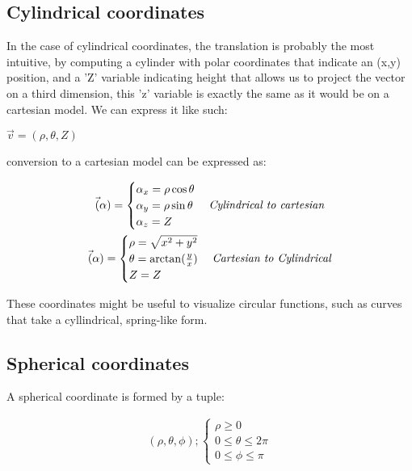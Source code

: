 \documentclass[11pt,fleqn]{book} %
\begin{document}
\subsection{Cylindrical coordinates}
In the case of cylindrical coordinates, the translation is probably the most intuitive, by computing
a cylinder with polar coordinates that indicate an (x,y) position, and a 'Z' variable indicating height 
that allows us to project the vector on a third dimension, this 'z' variable is exactly the same as it would be
on a cartesian model. We can express it like such:

$ \vec{v} = ( \rho, \theta, Z) $

conversion to a cartesian model can be expressed as:

\begin{gather}
    \vec(\alpha) =
    \begin{cases}
        \alpha_x = \rho \cos \theta \\
        \alpha_y = \rho \sin \theta \\
        \alpha_z = Z
    \end{cases}
    \text{\textit{Cylindrical to cartesian}}
    \\
    \vec(\alpha) =
    \begin{cases}
        \rho = \sqrt{x^2 + y^2} \\
        \theta =  \arctan(\frac{y}{x}) \\
        Z = Z
    \end{cases}
    \text{\textit{Cartesian to Cylindrical}}
\end{gather}

These coordinates might be useful to visualize circular 
functions, such as curves that take a cyllindrical, spring-like form.



\subsection{Spherical coordinates}

A spherical coordinate is formed by a tuple:

\begin{gather}
    (\rho, \theta ,\phi);
    \begin{cases}
        \rho \geq  0 \\
        0 \le \theta \le 2\pi \\
        0 \le \phi \le \pi    
    \end{cases}
\end{gather}
\end{document}
